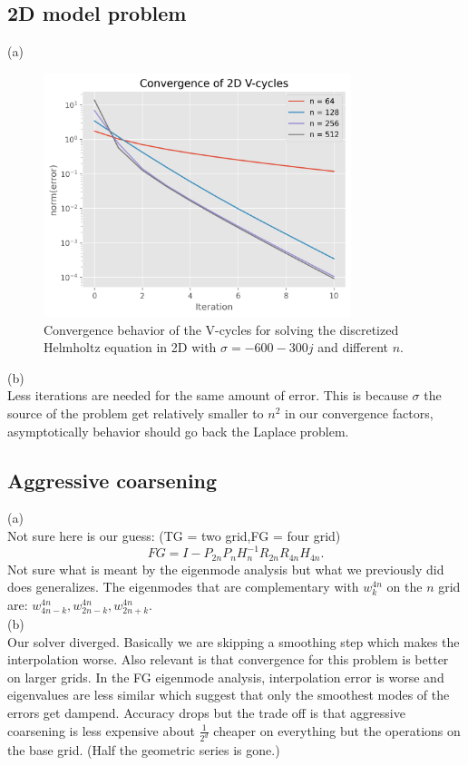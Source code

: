 \documentclass[a4paper,12pt]{article}
\begin{document}
\subsection{2D model problem}
(a) \\
\begin{figure}[h!]
    \centering
    \includegraphics[width=0.8\textwidth]{../code/plts/convergence_2Dcomplex.png}
    \caption{
        Convergence behavior of the V-cycles for solving
        the discretized Helmholtz equation in 2D with $\sigma = -600-300j$ and different $n$.
    }
    \label{fig: convergence 2D complex}
\end{figure}

(b) \\
Less iterations are needed for the same amount of error. This is because
$\sigma$ the source of the problem get relatively smaller to $n^{2}$ in
our convergence factors, asymptotically behavior should go back the
Laplace problem.

\subsection{Aggressive coarsening}
(a)\\
Not sure here is our guess: (TG = two grid,FG = four grid)
\begin{equation}
    FG = I -P_{2n} P_{n} H_{n}^{-1} R_{2n} R_{4n} H_{4n}.
\end{equation}
Not sure what is meant by the eigenmode analysis but what we previously
did does generalizes. The eigenmodes that are complementary with $w_{k}^{4n}$ on
the $n$ grid are: $w_{4n-k}^{4n},w_{2n-k}^{4n},w_{2n+k}^{4n}$. \\
(b)\\
Our solver diverged. Basically we are skipping a smoothing step which
makes the interpolation worse. Also relevant is that convergence
for this problem is better on larger grids. In the FG eigenmode analysis, interpolation error is worse
and eigenvalues are less similar which suggest that only the smoothest modes of the errors get dampend.
Accuracy drops but the trade off is that aggressive coarsening is less expensive about $\frac{1}{2^{d}}$
cheaper on everything but the operations on the base grid. (Half the geometric series is gone.)
\end{document}
